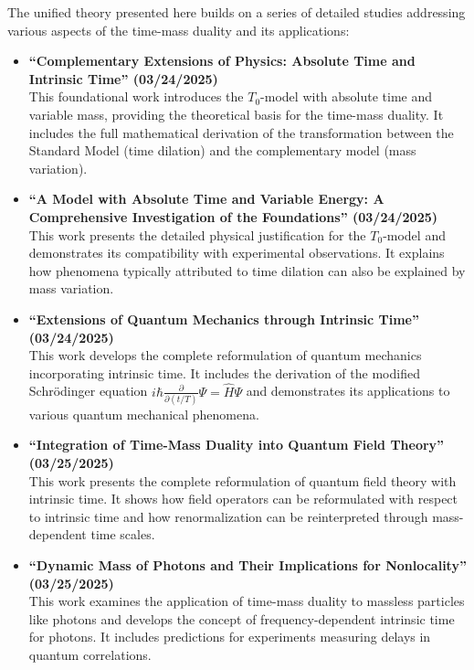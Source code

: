 \documentclass{article}
\begin{document}
The unified theory presented here builds on a series of detailed studies addressing various aspects of the time-mass duality and its applications:

\begin{itemize}
	\item \textbf{``Complementary Extensions of Physics: Absolute Time and Intrinsic Time'' (03/24/2025)} \\
	This foundational work introduces the \(T_0\)-model with absolute time and variable mass, providing the theoretical basis for the time-mass duality. It includes the full mathematical derivation of the transformation between the Standard Model (time dilation) and the complementary model (mass variation).
	
	\item \textbf{``A Model with Absolute Time and Variable Energy: A Comprehensive Investigation of the Foundations'' (03/24/2025)} \\
	This work presents the detailed physical justification for the \(T_0\)-model and demonstrates its compatibility with experimental observations. It explains how phenomena typically attributed to time dilation can also be explained by mass variation.
	
	\item \textbf{``Extensions of Quantum Mechanics through Intrinsic Time'' (03/24/2025)} \\
	This work develops the complete reformulation of quantum mechanics incorporating intrinsic time. It includes the derivation of the modified Schrödinger equation \(i\hbar \frac{\partial}{\partial (t/T)} \Psi = \hat{H} \Psi\) and demonstrates its applications to various quantum mechanical phenomena.
	
	\item \textbf{``Integration of Time-Mass Duality into Quantum Field Theory'' (03/25/2025)} \\
	This work presents the complete reformulation of quantum field theory with intrinsic time. It shows how field operators can be reformulated with respect to intrinsic time and how renormalization can be reinterpreted through mass-dependent time scales.
	
	\item \textbf{``Dynamic Mass of Photons and Their Implications for Nonlocality'' (03/25/2025)} \\
	This work examines the application of time-mass duality to massless particles like photons and develops the concept of frequency-dependent intrinsic time for photons. It includes predictions for experiments measuring delays in quantum correlations.
	

\end{itemize}
\end{document}
